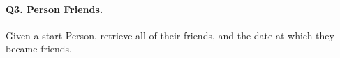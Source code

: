 \paragraph{\textbf{Q3}. Person Friends.}
Given a start Person, retrieve all of their friends, and the date at
which they became friends.
